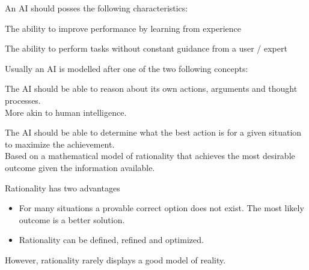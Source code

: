 \documentclass[
../../EiKI_Summary.tex,
]
{subfiles}
\begin{document}
An AI should posses the following characteristics:

\begin{minipage}
    [t]{0.5\textwidth}
    \centering
    \begin{defbox}
        [Adaptability]
        The ability to improve performance by learning from experience
    \end{defbox}
\end{minipage}
\begin{minipage}
    [t]{0.5\textwidth}
    \centering
    \begin{defbox}
        [Autonomous]
        The ability to perform tasks without constant guidance from a user / expert
    \end{defbox}
\end{minipage}

Usually an AI is modelled after one of the two following concepts:

\begin{minipage}
    [t]{0.5\textwidth}
    \centering
    \begin{defbox}
        The AI should be able to reason about its own actions, arguments and thought processes.\\
        More akin to human intelligence.
    \end{defbox}
\end{minipage}
\begin{minipage}
    [t]{0.5\textwidth}
    \centering
    \begin{defbox}
        The AI should be able to determine what the best action is for a given situation to maximize the achievement.\\
        Based on a mathematical model of rationality that achieves the most desirable outcome given the information available.
    \end{defbox}
\end{minipage}


Rationality has two advantages
\begin{itemize}
    \item {} For many situations a provable correct option does not exist. The most likely outcome is a better solution.
    \item {} Rationality can be defined, refined and optimized.
\end{itemize}
However, rationality rarely displays a good model of reality.
\end{document}
